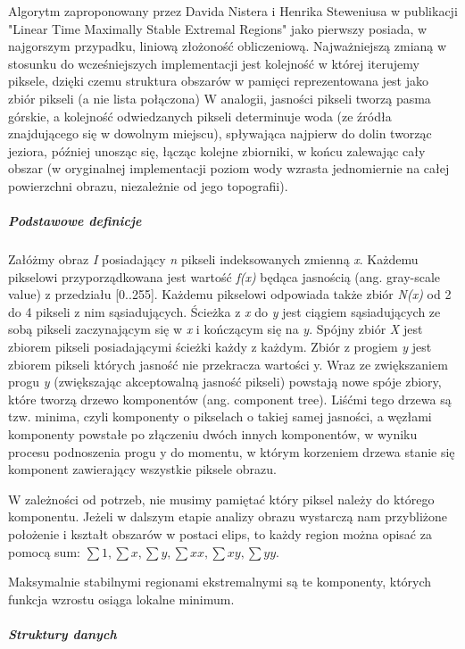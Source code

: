Algorytm zaproponowany przez Davida Nistera i Henrika Steweniusa w publikacji
"Linear Time Maximally Stable Extremal Regions" jako pierwszy posiada, w
najgorszym przypadku, liniową złożoność obliczeniową. Najważniejszą zmianą w
stosunku do wcześniejszych implementacji jest kolejność w której iterujemy
piksele, dzięki czemu struktura obszarów w pamięci reprezentowana jest jako
zbiór pikseli (a nie lista połączona) W analogii, jasności pikseli tworzą pasma
górskie, a kolejność odwiedzanych pikseli determinuje woda (ze źródła
znajdującego się w dowolnym miejscu), spływająca najpierw do dolin tworząc
jeziora, później unosząc się, łącząc kolejne zbiorniki, w końcu zalewając cały
obszar (w oryginalnej implementacji poziom wody wzrasta jednomiernie na całej
powierzchni obrazu, niezależnie od jego topografii).

\subparagraph{Podstawowe definicje}

Załóżmy obraz \textit{I} posiadający \textit{n} pikseli indeksowanych zmienną
\textit{x}. Każdemu pikselowi przyporządkowana jest wartość \textit{f(x)}
będąca jasnością (ang. gray-scale value) z przedziału [0..255]. Każdemu
pikselowi odpowiada także zbiór \textit{N(x)} od 2 do 4 pikseli z nim
sąsiadujących. Ścieżka z \textit{x} do \textit{y} jest ciągiem sąsiadujących ze
sobą pikseli zaczynającym się w \textit{x} i kończącym się na \textit{y}.
Spójny zbiór \textit{X} jest zbiorem pikseli posiadającymi ścieżki każdy z
każdym. Zbiór z progiem \textit{y} jest zbiorem pikseli których jasność nie
przekracza wartości y. Wraz ze zwiększaniem progu \textit{y} (zwiększając
akceptowalną jasność pikseli) powstają nowe spóje zbiory, które tworzą drzewo
komponentów (ang. component tree). Liśćmi tego drzewa są tzw. minima, czyli
komponenty o pikselach o takiej samej jasności, a węzłami komponenty powstałe
po złączeniu dwóch innych komponentów, w wyniku procesu podnoszenia progu y do
momentu, w którym korzeniem drzewa stanie się komponent zawierający wszystkie
piksele obrazu.

W zależności od potrzeb, nie musimy pamiętać który piksel należy do którego
komponentu. Jeżeli w dalszym etapie analizy obrazu wystarczą nam przybliżone
położenie i kształt obszarów w postaci elips, to każdy region można opisać za
pomocą sum: $\sum{1}, \sum{x}, \sum{y}, \sum{xx}, \sum{xy}, \sum{yy}$.

Maksymalnie stabilnymi regionami ekstremalnymi są te komponenty, których funkcja
wzrostu osiąga lokalne minimum. 

\subparagraph{Struktury danych}

